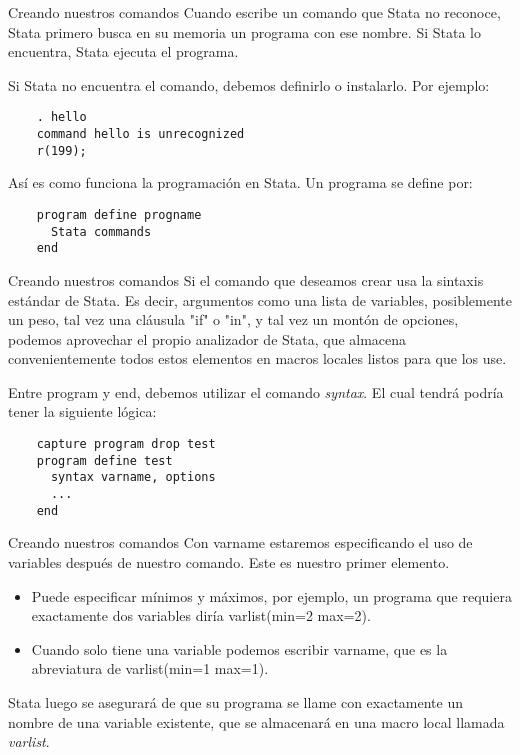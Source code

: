 \documentclass[10pt, aspectratio=169, compress]{beamer}
\begin{document}
\begin{frame}[t, fragile]{Creando nuestros comandos}
  Cuando escribe un comando que Stata no reconoce, Stata primero busca en su memoria un programa con ese nombre. Si Stata lo encuentra, Stata ejecuta el programa.
  
  Si Stata no encuentra el comando, debemos definirlo o instalarlo. Por ejemplo:

  \begin{lstlisting}
    . hello
    command hello is unrecognized
    r(199);
  \end{lstlisting}
  Así es como funciona la programación en Stata. Un programa se define por: 

  \begin{lstlisting}
    program define progname
      Stata commands
    end
  \end{lstlisting}
\end{frame}
\begin{frame}[t, fragile]{Creando nuestros comandos}
  Si el comando que deseamos crear usa la sintaxis estándar de Stata. Es decir, argumentos como una lista de variables, posiblemente un peso, tal vez una cláusula "if" o "in", y tal vez un montón de opciones, podemos aprovechar el propio analizador de Stata, que almacena convenientemente todos estos elementos en macros locales listos para que los use.

  Entre program y end, debemos utilizar el comando \textit{syntax}. El cual tendrá podría tener la siguiente lógica:
  \begin{lstlisting}
    capture program drop test
    program define test
      syntax varname, options
      ...
    end
  \end{lstlisting}
\end{frame}

\begin{frame}[t, fragile]{Creando nuestros comandos}
  Con varname estaremos especificando el uso de variables después de nuestro comando. Este es nuestro primer elemento.
  \begin{itemize}
    \item Puede especificar mínimos y máximos, por ejemplo, un programa que requiera exactamente dos variables diría varlist(min=2 max=2). 
    \item Cuando solo tiene una variable podemos escribir varname, que es la abreviatura de varlist(min=1 max=1).
  \end{itemize}
  Stata luego se asegurará de que su programa se llame con exactamente un nombre de una variable existente, que se almacenará en una macro local llamada \textit{varlist}.
\end{frame}
\end{document}
